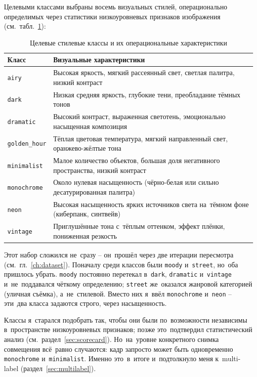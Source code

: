 \documentclass[a4paper,12pt]{diplom}
\begin{document}
Целевыми классами выбраны восемь визуальных стилей, операционально определимых через статистики низкоуровневых признаков изображения (см.~табл.~\ref{tab:classes}):

\begin{table}[!ht]
\caption{Целевые стилевые классы и их операциональные характеристики}
\label{tab:classes}
\centering
\begin{tabular}{lp{9.5cm}}
\toprule
\textbf{Класс} & \textbf{Визуальные характеристики} \\
\midrule
\texttt{airy}        & Высокая яркость, мягкий рассеянный свет, светлая палитра, низкий контраст \\
\texttt{dark}        & Низкая средняя яркость, глубокие тени, преобладание тёмных тонов \\
\texttt{dramatic}    & Высокий контраст, выраженная светотень, эмоционально насыщенная композиция \\
\texttt{golden\_hour}& Тёплая цветовая температура, мягкий направленный свет, оранжево-жёлтые тона \\
\texttt{minimalist}  & Малое количество объектов, большая доля негативного пространства, низкий контраст \\
\texttt{monochrome}  & Около нулевая насыщенность (чёрно-белая или сильно десатурированная палитра) \\
\texttt{neon}        & Высокая насыщенность ярких источников света на~тёмном фоне (киберпанк, синтвейв) \\
\texttt{vintage}     & Приглушённые тона с~тёплым оттенком, эффект плёнки, пониженная резкость \\
\bottomrule
\end{tabular}
\end{table}

Этот набор сложился не~сразу -- он~прошёл через две итерации пересмотра (см.~гл.~\ref{ch:dataset}). Поначалу среди классов были \texttt{moody} и~\texttt{street}, но~оба пришлось убрать. \texttt{moody} постоянно перетекал в~\texttt{dark}, \texttt{dramatic} и~\texttt{vintage} и~не~поддавался чёткому определению; \texttt{street} же~оказался жанровой категорией (уличная съёмка), а~не~стилевой. Вместо них я~ввёл \texttt{monochrome} и~\texttt{neon} -- эти~два класса задаются строго, через насыщенность.

Классы я~старался подобрать так, чтобы они были по~возможности независимы в~пространстве низкоуровневых признаков; позже это~подтвердил статистический анализ (см.~раздел~\ref{sec:scorecard}). Но~на~уровне конкретного снимка совмещения всё~равно случаются: кадр запросто может быть одновременно \texttt{monochrome} и~\texttt{minimalist}. Именно это~в~итоге и~подтолкнуло меня к~multi-label (раздел~\ref{sec:multilabel}).
\end{document}
